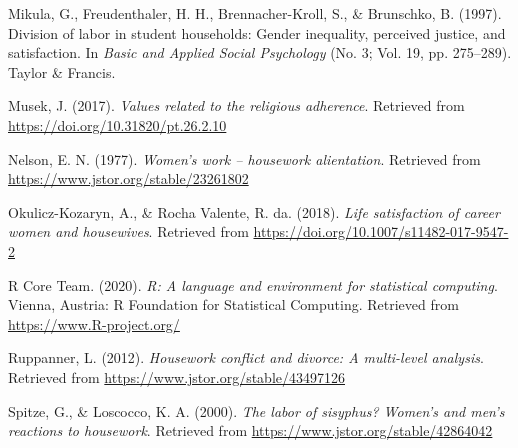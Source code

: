 \documentclass[
  man,floatsintext]{apa6}
\newlength{\cslhangindent}
\newlength{\cslentryspacingunit} %
\newenvironment{CSLReferences}[2] %
 {%
  \setlength{\parindent}{0pt}
  \ifodd #1
  \let\oldpar\par
  \def\par{\hangindent=\cslhangindent\oldpar}
  \fi
  \setlength{\parskip}{#2\cslentryspacingunit}
 }%
 {}
\begin{document}
\begin{CSLReferences}{1}{0}
\leavevmode{}%
Mikula, G., Freudenthaler, H. H., Brennacher-Kroll, S., \& Brunschko, B. (1997). Division of labor in student households: Gender inequality, perceived justice, and satisfaction. In \emph{Basic and Applied Social Psychology} (No. 3; Vol. 19, pp. 275--289). Taylor \& Francis.

\leavevmode{}%
Musek, J. (2017). \emph{Values related to the religious adherence}. Retrieved from \url{https://doi.org/10.31820/pt.26.2.10}

\leavevmode{}%
Nelson, E. N. (1977). \emph{Women's work -- housework alientation}. Retrieved from \url{https://www.jstor.org/stable/23261802}

\leavevmode{}%
Okulicz-Kozaryn, A., \& Rocha Valente, R. da. (2018). \emph{Life satisfaction of career women and housewives}. Retrieved from \url{https://doi.org/10.1007/s11482-017-9547-2}

\leavevmode{}%
R Core Team. (2020). \emph{R: A language and environment for statistical computing}. Vienna, Austria: R Foundation for Statistical Computing. Retrieved from \url{https://www.R-project.org/}

\leavevmode{}%
Ruppanner, L. (2012). \emph{Housework conflict and divorce: A multi-level analysis}. Retrieved from \url{https://www.jstor.org/stable/43497126}

\leavevmode{}%
Spitze, G., \& Loscocco, K. A. (2000). \emph{The labor of sisyphus? Women's and men's reactions to housework}. Retrieved from \url{https://www.jstor.org/stable/42864042}

\end{CSLReferences}


\clearpage
\renewcommand{\listfigurename}{Figure captions}

\clearpage
\renewcommand{\listtablename}{Table captions}
\end{document}

